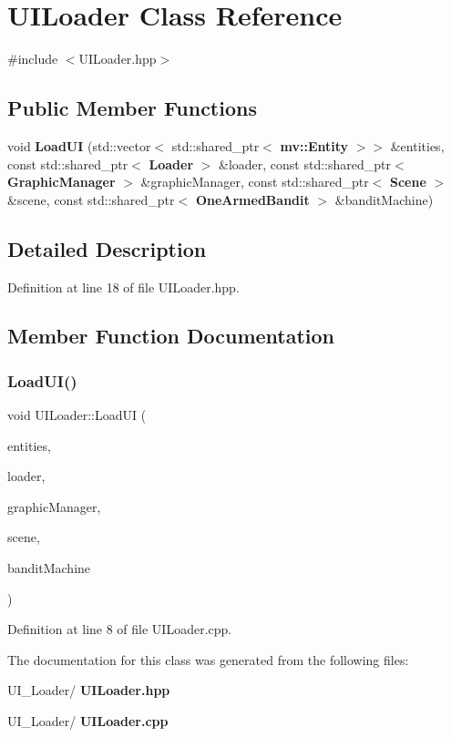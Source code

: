 \section{U\+I\+Loader Class Reference}
\label{class_u_i_loader}


{\ttfamily \#include $<$U\+I\+Loader.\+hpp$>$}

\subsection*{Public Member Functions}
\begin{DoxyCompactItemize}
\item 
void \textbf{ Load\+UI} (std\+::vector$<$ std\+::shared\+\_\+ptr$<$ \textbf{ mv\+::\+Entity} $>$$>$ \&entities, const std\+::shared\+\_\+ptr$<$ \textbf{ Loader} $>$ \&loader, const std\+::shared\+\_\+ptr$<$ \textbf{ Graphic\+Manager} $>$ \&graphic\+Manager, const std\+::shared\+\_\+ptr$<$ \textbf{ Scene} $>$ \&scene, const std\+::shared\+\_\+ptr$<$ \textbf{ One\+Armed\+Bandit} $>$ \&bandit\+Machine)
\end{DoxyCompactItemize}


\subsection{Detailed Description}


Definition at line 18 of file U\+I\+Loader.\+hpp.



\subsection{Member Function Documentation}
\mbox{\label{class_u_i_loader_a23b060b4e097cc4a7039b95d8100d2a2}} 
\subsubsection{Load\+U\+I()}
{\footnotesize\ttfamily void U\+I\+Loader\+::\+Load\+UI (\begin{DoxyParamCaption}\item[{std\+::vector$<$ std\+::shared\+\_\+ptr$<$ \textbf{ mv\+::\+Entity} $>$$>$ \&}]{entities,  }\item[{const std\+::shared\+\_\+ptr$<$ \textbf{ Loader} $>$ \&}]{loader,  }\item[{const std\+::shared\+\_\+ptr$<$ \textbf{ Graphic\+Manager} $>$ \&}]{graphic\+Manager,  }\item[{const std\+::shared\+\_\+ptr$<$ \textbf{ Scene} $>$ \&}]{scene,  }\item[{const std\+::shared\+\_\+ptr$<$ \textbf{ One\+Armed\+Bandit} $>$ \&}]{bandit\+Machine }\end{DoxyParamCaption})}



Definition at line 8 of file U\+I\+Loader.\+cpp.



The documentation for this class was generated from the following files\+:\begin{DoxyCompactItemize}
\item 
U\+I\+\_\+\+Loader/\textbf{ U\+I\+Loader.\+hpp}\item 
U\+I\+\_\+\+Loader/\textbf{ U\+I\+Loader.\+cpp}\end{DoxyCompactItemize}

